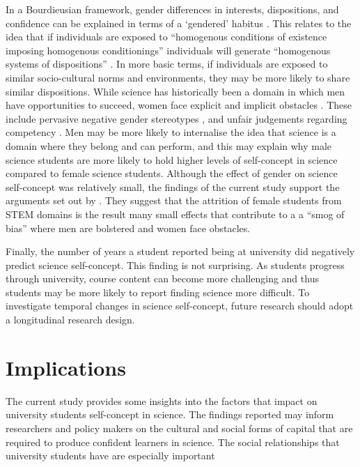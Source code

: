 In a Bourdieusian framework, gender differences in interests, dispositions, and confidence can be explained in terms of a `gendered' habitus \cite{Reay_2004}. This relates to the idea that if individuals are exposed to ``homogenous conditions of existence imposing homogenous conditionings'' individuals will generate ``homogenous systems of dispositions'' \cite[p.101]{Bourdieu1984}. In more basic terms, if individuals are exposed to similar socio-cultural norms and environments, they may be more likely to share similar dispositions. While science has historically been a domain in which men have opportunities to succeed, women face explicit and implicit obstacles \cite{cheryan2017some,Blickenstaff_2005}. These include pervasive negative gender stereotypes \cite{Nosek_2009}, and unfair judgements regarding competency \cite{Moss_2012,Barthelemy_2016}. Men may be more likely to internalise the idea that science is a domain where they belong and can perform, and this may explain why male science students are more likely to hold higher levels of self-concept in science compared to female science students. Although the effect of gender on science self-concept was relatively small, the findings of the current study support the arguments set out by \cite{Kost_Smith_2010}. They suggest that the attrition of female students from STEM domains is the result many small effects that contribute to a a ``smog of bias'' where men are bolstered and women face obstacles. 

Finally, the number of years a student reported being at university did negatively predict science self-concept. This finding is not surprising. As students progress through university, course content can become more challenging and thus students may be more likely to report finding science more difficult. To investigate temporal changes in science self-concept, future research should adopt a longitudinal research design. 

\section*{Implications}
The current study provides some insights into the factors that impact on university students self-concept in science. The findings reported may inform researchers and policy makers on the cultural and social forms of capital that are required to produce confident learners in science. The social relationships that university students have are especially important

